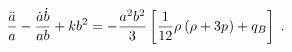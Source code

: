 \begin{equation}
\frac{\ddot{a}}{a}-\frac{\dot{a}\dot{b}}{ab}+kb^2
  = -{a^2b^2\over 3}\left[\frac{1}{12}\rho^{ }\left(\rho{ }+3p^{ }\right)
    +q_B\right]\; .
\end{equation}

